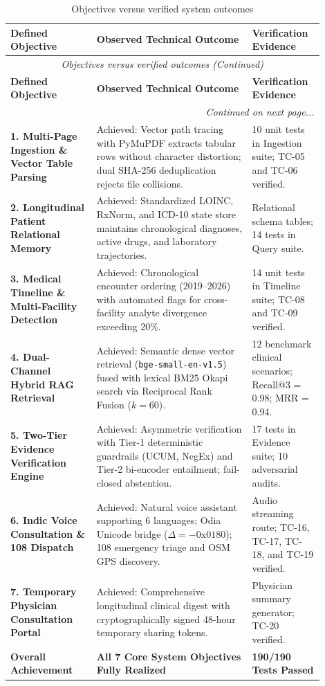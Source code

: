 \small
\begin{longtable}{@{}p{0.25\linewidth} p{0.45\linewidth} p{0.20\linewidth}@{}}
\caption{Objectives versus verified system outcomes}\label{tab:9_1_objectives} \\
\toprule
\textbf{Defined Objective} & \textbf{Observed Technical Outcome} & \textbf{Verification Evidence} \\
\midrule
\endfirsthead
\toprule
\multicolumn{3}{c}{\small\textit{Objectives versus verified outcomes (Continued)}} \\[4pt]
\midrule
\textbf{Defined Objective} & \textbf{Observed Technical Outcome} & \textbf{Verification Evidence} \\
\midrule
\endhead
\midrule
\multicolumn{3}{r}{\footnotesize\textit{Continued on next page...}} \\
\bottomrule
\endfoot
\bottomrule
\endlastfoot
\textbf{1. Multi-Page Ingestion \& Vector Table Parsing} & Achieved: Vector path tracing with PyMuPDF extracts tabular rows without character distortion; dual SHA-256 deduplication rejects file collisions. & 10 unit tests in Ingestion suite; TC-05 and TC-06 verified. \\
\textbf{2. Longitudinal Patient Relational Memory} & Achieved: Standardized LOINC, RxNorm, and ICD-10 state store maintains chronological diagnoses, active drugs, and laboratory trajectories. & Relational schema tables; 14 tests in Query suite. \\
\textbf{3. Medical Timeline \& Multi-Facility Detection} & Achieved: Chronological encounter ordering (2019--2026) with automated flags for cross-facility analyte divergence exceeding 20\%. & 14 unit tests in Timeline suite; TC-08 and TC-09 verified. \\
\textbf{4. Dual-Channel Hybrid RAG Retrieval} & Achieved: Semantic dense vector retrieval (\texttt{bge-small-en-v1.5}) fused with lexical BM25 Okapi search via Reciprocal Rank Fusion ($k=60$). & 12 benchmark clinical scenarios; Recall@3 = 0.98; MRR = 0.94. \\
\textbf{5. Two-Tier Evidence Verification Engine} & Achieved: Asymmetric verification with Tier-1 deterministic guardrails (UCUM, NegEx) and Tier-2 bi-encoder entailment; fail-closed abstention. & 17 tests in Evidence suite; 10 adversarial audits. \\
\textbf{6. Indic Voice Consultation \& 108 Dispatch} & Achieved: Natural voice assistant supporting 6 languages; Odia Unicode bridge ($\Delta = -0\text{x}0180$); 108 emergency triage and OSM GPS discovery. & Audio streaming route; TC-16, TC-17, TC-18, and TC-19 verified. \\
\textbf{7. Temporary Physician Consultation Portal} & Achieved: Comprehensive longitudinal clinical digest with cryptographically signed 48-hour temporary sharing tokens. & Physician summary generator; TC-20 verified. \\
\midrule
\textbf{Overall Achievement} & \textbf{All 7 Core System Objectives Fully Realized} & \textbf{190/190 Tests Passed} \\
\bottomrule
\end{longtable}
\normalsize


